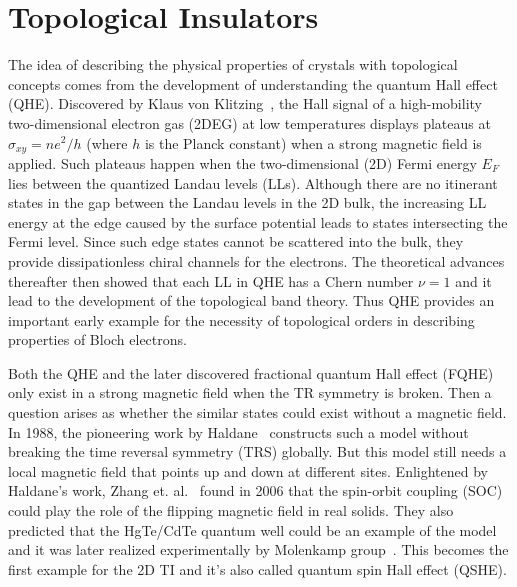 \section{Topological Insulators}
\label{sec:intro:TI}


The idea of describing the physical properties of crystals with topological concepts comes from the development of understanding the quantum Hall effect (QHE). Discovered by Klaus von Klitzing~\cite{Klitzing1980}, the Hall signal of a high-mobility two-dimensional electron gas (2DEG) at low temperatures displays plateaus at $\sigma_{xy}=ne^2/h$ (where $h$ is the Planck constant) when a strong magnetic field is applied. Such plateaus happen when the two-dimensional (2D) Fermi energy $E_F$ lies between the quantized Landau levels (LLs). Although there are no itinerant states in the gap between the Landau levels in the 2D bulk, the increasing LL energy at the edge caused by the surface potential leads to states intersecting the Fermi level. Since such edge states cannot be scattered into the bulk, they provide dissipationless chiral channels for the electrons. The theoretical advances thereafter then showed that each LL in QHE has a Chern number $\nu=1$ and it lead to the development of the topological band theory. Thus QHE provides an important early example for the necessity of topological orders in describing properties of Bloch electrons.

Both the QHE and the later discovered fractional quantum Hall effect (FQHE) only exist in a strong magnetic field when the TR symmetry is broken. Then a question arises as whether the similar states could exist without a magnetic field. In 1988, the pioneering work by Haldane~\cite{Haldane1988} constructs such a model without breaking the time reversal symmetry (TRS) globally. But this model still needs a local magnetic field that points up and down at different sites. Enlightened by Haldane's work, Zhang et. al.~\cite{Bernevig06} found in 2006 that the spin-orbit coupling (SOC) could play the role of the flipping magnetic field in real solids. They also predicted that the HgTe/CdTe quantum well could be an example of the model and it was later realized experimentally by Molenkamp group~\cite{Konig2007}. This becomes the first example for the 2D TI and it's also called quantum spin Hall effect (QSHE). 


